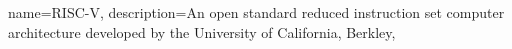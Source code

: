 \makeglossaries

{
    name={RISC-V},
    description={An open standard reduced instruction set computer architecture developed by the University of California, Berkley},
}